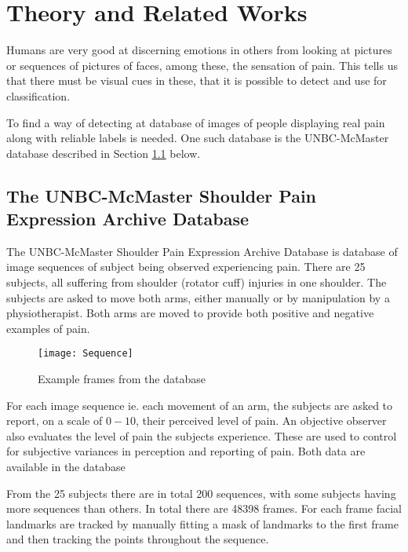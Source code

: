 \documentclass[Main]{subfiles}
\begin{document}
\section{Theory and Related Works} %
	\label{sec:theory_and_related_works}
	Humans are very good at discerning emotions in others from looking at pictures or sequences of pictures of faces, among these, the sensation of pain.
	This tells us that there must be visual cues in these, that it is possible to detect and use for classification.

	To find a way of detecting at database of images of people displaying real pain along with reliable labels is needed.
	One such database is the UNBC-McMaster database described in Section \ref{sub:unbc_mcmaster} below.

	\subsection{The UNBC-McMaster Shoulder Pain Expression Archive Database} %
		\label{sub:unbc_mcmaster}
		The UNBC-McMaster Shoulder Pain Expression Archive Database \cite{Lucey2011} is database of image sequences of subject being observed experiencing pain.
		There are 25 subjects, all suffering from shoulder (rotator cuff) injuries in one shoulder.
		The subjects are asked to move both arms, either manually or by manipulation by a physiotherapist.
		Both arms are moved to provide both positive and negative examples of pain.
		\begin{figure}[H]
			\begin{center}
				\texttt{[image: Sequence]}
			\end{center}
			\caption{Example frames from the database}
			\label{fig:examlpe_sequence}
		\end{figure}

		For each image sequence ie. each movement of an arm, the subjects are asked to report, on a scale of $0-10$, their perceived level of pain.
		An objective observer also evaluates the level of pain the subjects experience.
		These are used to control for subjective variances in perception and reporting of pain.
		Both data are available in the database

		From the 25 subjects there are in total 200 sequences, with some subjects having more sequences than others.
		In total there are 48398 frames.
		For each frame facial landmarks are tracked by manually fitting a mask of landmarks to the first frame and then tracking the points throughout the sequence.
\end{document}
